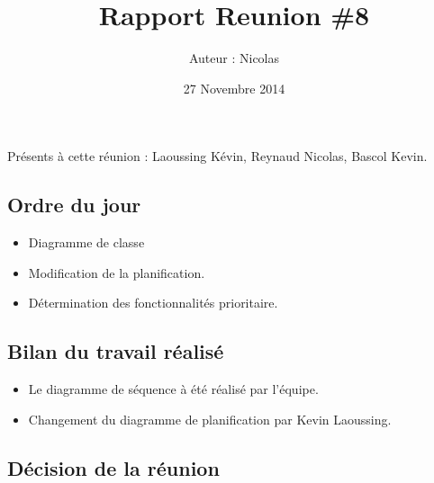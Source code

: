 \documentclass[12pt,a4paper]{article}
\title{Rapport Reunion \#8}
\author{Auteur : Nicolas \bsc{REYNAUD}}
\date{27 Novembre 2014}
\begin{document}
\maketitle

\newpage

Présents à cette réunion : Laoussing Kévin, Reynaud Nicolas, Bascol Kevin.\\


\subsection*{Ordre du jour}
\begin{itemize}[label = $\ast$]
\item Diagramme de classe
\item Modification de la planification.
\item Détermination des fonctionnalités prioritaire.
\end{itemize}

\subsection*{Bilan du travail réalisé}

\begin{itemize}[label = $\ast$]
	\item Le diagramme de séquence à été réalisé par l'équipe.
	\item Changement du diagramme de planification par Kevin Laoussing.
\end{itemize}


\subsection*{Décision de la réunion}
\end{document}

